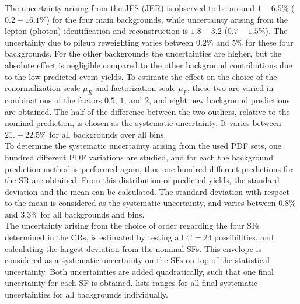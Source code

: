 The uncertainty arising from the JES (JER) is observed to be around $1-6.5\%$ ($0.2-16.1\%$) for the four main backgrounds, while uncertainty arising from the lepton (photon) identification and reconstruction is $1.8-3.2$ ($0.7-1.5\%$). The uncertainty due to pileup reweighting varies between $0.2\%$ and $5\%$ for these four backgrounds. For the other backgrounds the uncertainties are higher, but the absolute effect is negligible compared to the other background contributions due to the low predicted event yields.
To estimate the effect on the choice of the renormalization scale $\mu_R$ and factorization scale $\mu_F$, these two are varied in combinations of the factors $0.5$, $1$, and $2$, and eight new background predictions are obtained. The half of the difference between the two outliers, relative to the nominal prediction, is chosen as the systematic uncertainty. It varies between $21.-22.5\%$ for all backgrounds over all bins.\\
To determine the systematic uncertainty arising from the used PDF sets, one hundred different PDF variations are studied, and for each the background prediction method is performed again, thus one hundred different predictions for the SR are obtained. From this distribution of predicted yields, the standard deviation and the mean can be calculated. The standard deviation with respect to the mean is considered as the systematic uncertainty, and varies between $0.8\%$ and $3.3\%$ for all backgrounds and bins.\\
The uncertainty arising from the choice of order regarding the four SFs determined in the CRs, is estimated by testing all $4!=24$ possibilities, and calculating the largest deviation from the nominal SFs. This envelope is considered as a systematic uncertainty on the SFs on top of the statistical uncertainty. Both uncertainties are added quadratically, such that one final uncertainty for each SF is obtained.
 lists ranges for all final systematic uncertainties for all backgrounds individually.
